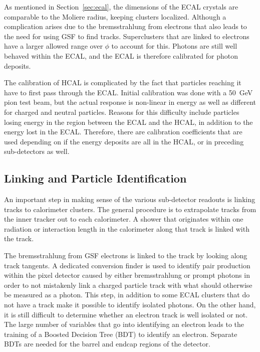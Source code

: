 As mentioned in Section~\ref{sec:ecal}, the dimensions of the ECAL crystals
are comparable to the Moliere radius, keeping clusters localized.
Although a complication arises due to the bremsstrahlung from electrons that also leads to
the need for using GSF to find tracks.
Superclusters that are linked to electrons have
a larger allowed range over $\phi$ to account for this.
Photons are still well behaved within the ECAL,
and the ECAL is therefore calibrated for photon deposits.

The calibration of HCAL is complicated by the fact that particles reaching it
have to first pass through the ECAL.
Initial calibration was done with a \SI{50}{GeV} pion test beam,
but the actual response is non-linear in energy
as well as different for charged and neutral particles.
Reasons for this difficulty include particles losing energy in the region
between the ECAL and the HCAL, in addition to the energy lost in the ECAL.
Therefore, there are calibration coefficients that are used
depending on if the energy deposits are all in the HCAL,
or in preceding sub-detectors as well.

\subsection{Linking and Particle Identification}

An important step in making sense of the various sub-detector readouts is linking
tracks to calorimeter clusters.
The general procedure is to extrapolate tracks from the inner tracker
out to each calorimeter.
A shower that originates within one radiation or interaction length in the calorimeter
along that track is linked with the track.

The bremsstrahlung from GSF electrons is linked to the track by looking along track tangents.
A dedicated conversion finder is used to identify pair production within the pixel detector
caused by either bremsstrahlung or prompt photons in order to not mistakenly link
a charged particle track with what should otherwise be measured as a photon.
This step, in addition to some ECAL clusters that do not have a track
make it possible to identify isolated photons.
On the other hand, it is still difficult to determine
whether an electron track is well isolated or not.
The large number of variables that go into identifying an electron
leads to the training of a Boosted Decision Tree (BDT) to identify an electron.
Separate BDTs are needed for the barrel and endcap regions of the detector.

